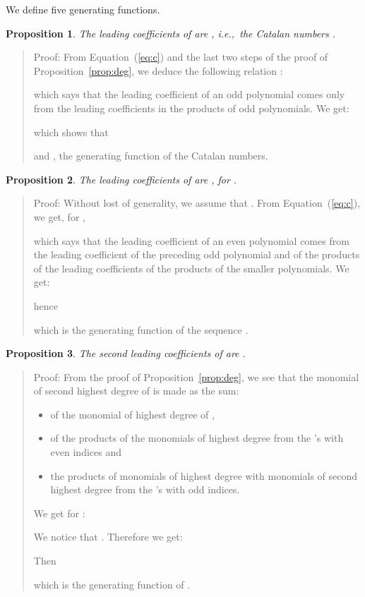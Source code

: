 \documentclass[preprint,authoryear]{elsarticle}
\newenvironment{proof}[1]{\begin{quotation}\noindent\textsf{Proof:} #1}{\end{quotation}}
\newtheorem{prop}{Proposition}
\newcommand{\ie}{i.e.,~}
\begin{document}
We define five generating functions.

  
  

\begin{prop}\label{prop:lead_co_P_odd}
  The leading coefficients of  are , \ie the
  Catalan numbers .
\end{prop}
\begin{proof}{}
  From Equation~(\ref{eq:c}) and the last two steps of the proof of
  Proposition~\ref{prop:deg}, we deduce the following relation :

which says that the leading coefficient of an odd  polynomial comes only from the leading
coefficients in the products of odd polynomials.
We get:

which shows that

and , the generating function of the Catalan numbers.
\end{proof}
\begin{prop}
  The leading coefficients of  are , for .
\end{prop}
\begin{proof}{}
Without lost of generality, we  assume that .
From Equation~(\ref{eq:c}), we get, for ,
  
which says that the leading coefficient of an even polynomial comes from the leading
coefficient of the preceding odd polynomial and of the products of the leading coefficients of
the products of the smaller polynomials. 
We get:

hence

which is the generating function of  the sequence .
\end{proof}
\begin{prop}
  The second leading coefficients of  are .
\end{prop}
\begin{proof}{}
 From the proof of Proposition~\ref{prop:deg}, we see that the
  monomial of second highest degree of  is made as the sum:
  \begin{itemize}
  \item of the monomial of highest degree of ,
  \item of the products of the
    monomials of highest degree from the 's with even indices and
  \item the products of
    monomials of highest degree with monomials of second highest degree from the 's
    with odd indices.
  \end{itemize}
We get for :
  
We notice that .  Therefore we get:

Then

which is the generating function of .
\end{proof}
\end{document}
